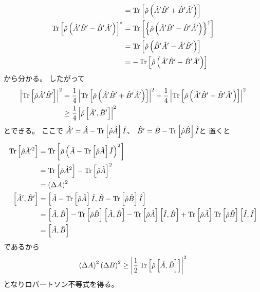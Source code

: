 \documentclass[a4paper, 10pt, uplatex]{jsarticle}
\begin{document}
\begin{problem}
\begin{align}
		&= \operatorname*{Tr} \left[ \hat{\rho} \left( \hat{A}' \hat{B}'
		+ \hat{B}' \hat{A}' \right) \right] \\
		\operatorname*{Tr} \left[ \hat{\rho}
		\left( \hat{A}' \hat{B}' - \hat{B}' \hat{A}' \right) \right]^*
		&= \operatorname*{Tr} \left[ \left\{ \hat{\rho} \left( \hat{A}' \hat{B}'
		- \hat{B}' \hat{A}' \right) \right\}^\dagger \right] \\
		&= \operatorname*{Tr} \left[ \hat{\rho} \left( \hat{B}' \hat{A}'
		- \hat{A}' \hat{B}' \right) \right] \\
		&= - \operatorname*{Tr} \left[ \hat{\rho} \left( \hat{A}' \hat{B}'
		- \hat{B}' \hat{A}' \right) \right]
	\end{align}
	から分かる。
	したがって
	\begin{align}
		\left| \operatorname*{Tr} \left[ \hat{\rho} \hat{A}' \hat{B}' \right] \right|^2
		&= \frac{1}{4} \left| \operatorname*{Tr} \left[ \hat{\rho}
		\left( \hat{A}' \hat{B}' + \hat{B}' \hat{A}' \right) \right] \right|^2
		+ \frac{1}{4} \left| \operatorname*{Tr} \left[ \hat{\rho}
		\left( \hat{A}' \hat{B}' - \hat{B}' \hat{A}' \right) \right] \right|^2
		\\
		&\geq \frac{1}{4} \left| \hat{\rho}
		\left[ \hat{A}', \hat{B}' \right] \right|^2
	\end{align}
	とできる。
	ここで
	$\hat{A}' = \hat{A} - \operatorname*{Tr} \left[ \hat{\rho} \hat{A} \right] \hat{I}$、
	$\hat{B}' = \hat{B} - \operatorname*{Tr} \left[ \hat{\rho} \hat{B} \right] \hat{I}$と
	置くと
	\begin{align}
		\operatorname*{Tr} \left[ \hat{\rho} \hat{A}'^2 \right]
		&= \operatorname*{Tr} \left[ \hat{\rho} \left( \hat{A}
		- \operatorname*{Tr} \left[ \hat{\rho} \hat{A} \right] \hat{I} \right)^2 \right] \\
		&= \operatorname*{Tr} \left[ \hat{\rho} \hat{A}^2 \right]
		- \operatorname*{Tr} \left[ \hat{\rho} \hat{A} \right]^2 \\
		&= \left( \Delta A \right)^2 \\
		\left[ \hat{A}', \hat{B}' \right]
		&= \left[ \hat{A} - \operatorname*{Tr} \left[ \hat{\rho} \hat{A} \right] \hat{I},
		\hat{B} - \operatorname*{Tr} \left[ \hat{\rho} \hat{B} \right] \hat{I} \right] \\
		&= \left[ \hat{A}, \hat{B} \right]
		- \operatorname*{Tr} \left[ \hat{\rho} \hat{B} \right]
		\left[ \hat{A}, \hat{B} \right]
		- \operatorname*{Tr} \left[ \hat{\rho} \hat{A} \right]
		\left[ \hat{I}, \hat{B} \right]
		+ \operatorname*{Tr} \left[ \hat{\rho} \hat{A} \right] \operatorname*{Tr} \left[ \hat{\rho} \hat{B}
		\right] \left[ \hat{I}, \hat{I} \right] \\
		&= \left[ \hat{A}, \hat{B} \right]
	\end{align}
	であるから
	\begin{align}
		\left( \Delta A \right)^2 \left( \Delta B \right)^2
		\geq \left| \frac{1}{2}
		\operatorname*{Tr} \left[ \hat{\rho} \left[ \hat{A}, \hat{B} \right] \right]
		\right|^2
	\end{align}
	となりロバートソン不等式を得る。
\end{problem}
\end{document}
